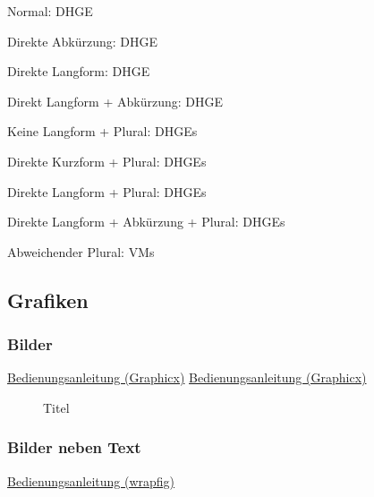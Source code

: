 \documentclass[a4paper, 11pt]{article}
\begin{document}
Normal:                                   \ac{DHGE}

Direkte Abkürzung:                        \acs{DHGE}

Direkte Langform:                         \acl{DHGE}

Direkt Langform + Abkürzung:              \acf{DHGE}

Keine Langform + Plural:                  \acp{DHGE}

Direkte Kurzform + Plural:                \acsp{DHGE}

Direkte Langform + Plural:                \acfp{DHGE}

Direkte Langform + Abkürzung + Plural:    \aclp{DHGE}

Abweichender Plural:                      \acp{VM}
\newpage


\subsection{Grafiken}

\subsubsection{Bilder}

\href{https://texdoc.org/serve/graphicx.pdf/0}{Bedienungsanleitung (Graphicx)}
\href{https://en.wikibooks.org/wiki/LaTeX/Importing_Graphics}{Bedienungsanleitung (Graphicx)}

\par\medskip
\begin{figure}[!ht]
    \centering
    \caption[Titel in Abbildungsverzeichnis]{Titel\footnotemark}
    \label{fig:ExampleImage}
\end{figure}
\newpage

\subsubsection{Bilder neben Text}

\href{https://ctan.ebinger.cc/tex-archive/macros/latex/contrib/wrapfig/wrapfig-doc.pdf}{Bedienungsanleitung (wrapfig)}
\end{document}
